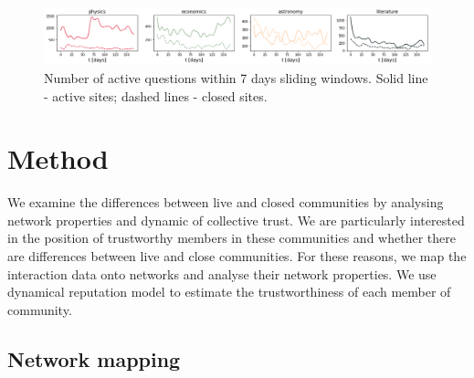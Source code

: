 
\begin{figure}
	\centering
	\includegraphics[width=0.5\linewidth]{Figures/Active_questions_7days.png}
	\caption{Number of active questions within 7 days sliding windows. Solid line - active sites; dashed lines - closed sites.}
	\label{fig:active_questions}
\end{figure}

\section{Method \label{sec:method}}

We examine the differences between live and closed communities by analysing network properties and dynamic of collective trust. We are particularly interested in the position of trustworthy members in these communities and whether there are differences between live and close communities. For these reasons, we map the interaction data onto networks and analyse their network properties. We use dynamical reputation model to estimate the trustworthiness of each member of community.     

\subsection{Network mapping}

